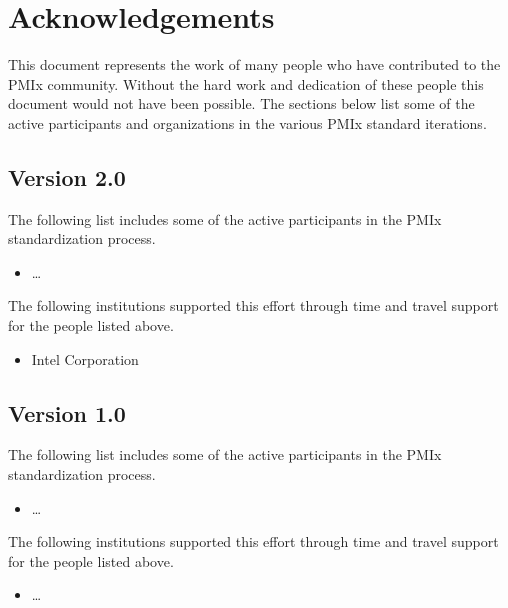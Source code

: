 \chapter{Acknowledgements}
\label{chap:acknowledgements}

This document represents the work of many people who have contributed to the PMIx community.
Without the hard work and dedication of these people this document would not have been possible.
The sections below list some of the active participants and organizations in the various PMIx standard iterations.

\section{Version 2.0}

The following list includes some of the active participants in the PMIx standardization process.

\begin{itemize}
\item \ldots
\end{itemize}

The following institutions supported this effort through time and travel support for the people listed above.

\begin{itemize}
\item Intel Corporation
\end{itemize}


\section{Version 1.0}

The following list includes some of the active participants in the PMIx standardization process.

\begin{itemize}
\item \ldots
\end{itemize}

The following institutions supported this effort through time and travel support for the people listed above.

\begin{itemize}
\item \ldots
\end{itemize}

